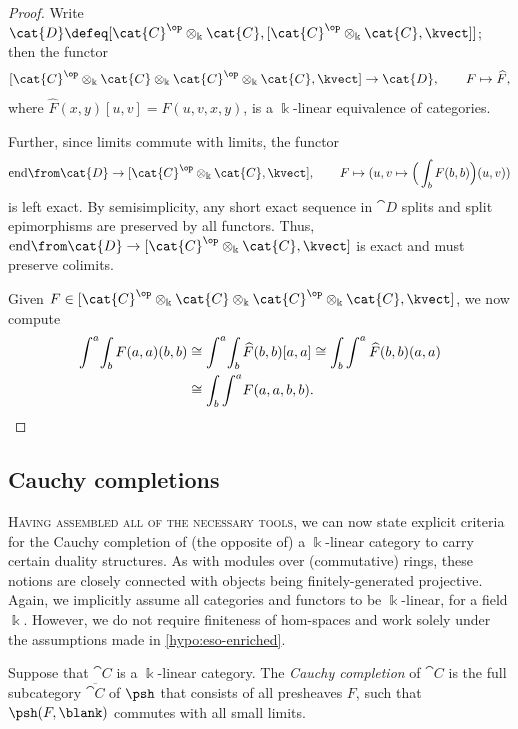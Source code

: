 \begin{proof}
  Write \(\cat{D} \defeq [\cat{C}^{\op}\otimes_{\Bbbk} \cat{C}, [\cat{C}^{\op} \otimes_{\Bbbk}\cat{C}, \kvect]]\);
  then the functor
  \[
    [\cat{C}^{\op}\otimes_{\Bbbk} \cat{C} \otimes_{\Bbbk}\cat{C}^{\op} \otimes_{\Bbbk}\cat{C}, \kvect] \to \cat{D},\qquad
    F \mapsto \widehat F,
  \]
  where \(\widehat{F}(x,y)[u,v] = F(u,v,x,y)\),
  is a \(\Bbbk\)\hyp{}linear equivalence of categories.

  Further, since limits commute with limits,
  the functor
  \[
    \mathrm{end}\from \cat{D} \to [\cat{C}^{\op} \otimes_{\Bbbk}\cat{C}, \kvect],
    \qquad
    F \mapsto (u,v \mapsto \Big(\int_b F(b,b)\Big)(u, v))
  \]
  is left exact.
  By semisimplicity, any short exact sequence in \(\cat{D}\) splits and split epimorphisms are preserved by all functors.
  Thus, \(\mathrm{end} \from\cat{D}\to [\cat{C}^{\op} \otimes_{\Bbbk}\cat{C}, \kvect]\) is exact and must preserve colimits.

  Given \(F\in  [\cat{C}^{\op}\otimes_{\Bbbk}\cat{C} \otimes_{\Bbbk}\cat{C}^{\op}\otimes_{\Bbbk}\cat{C}, \kvect]\), we now compute
  \begin{align*}
    \int^a\!\int_b F(a,a)(b,b)
    & \cong \int^a\!\int_b\widehat{F}(b,b)[a,a]
      \cong \int_b\int^a\widehat{F}(b,b)(a,a)\\
    & \cong \int_b\int^a\! F(a,a,b,b).\qedhere
  \end{align*}
\end{proof}

\subsection{Cauchy completions}\label{sec: trep-rigid-fgp}

\textsc{Having assembled all of the necessary tools},
we can now state explicit criteria for the Cauchy completion of (the opposite of) a \(\Bbbk\)\hyp{}linear category to carry certain duality structures.
As with modules over (commutative) rings, these notions are closely connected with objects being finitely\hyp{}generated projective.
Again, we implicitly assume all categories and functors to be \(\Bbbk\)\hyp{}linear, for a field \(\Bbbk\).
However, we do not require finiteness of hom-spaces and work solely under the assumptions made in \cref{hypo:eso-enriched}.

\begin{definition}\label{def:k-linear-cauchy-completion}
  Suppose that \(\cat{C}\) is a \(\Bbbk\)\hyp{}linear category.
  The \emph{Cauchy completion} of \(\cat{C}\) is the full subcategory \(\overline{\cat{C}}\) of \(\psh\)
  that consists of all presheaves \(F\),
  such that \(\psh(F, \blank)\) commutes with all small limits.
\end{definition}

